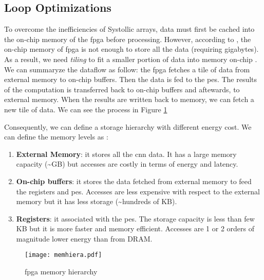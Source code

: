 \subsection{Loop Optimizations} \label{subsec:loopopti}
%
%
To overcome the inefficiencies of Systollic arrays, data must first be cached into the on-chip memory of the \acrshort{fpga} before processing. However, according to \textcite{ma_optimizing_2018}, the on-chip memory of \acrshort{fpga} is not enough to store all the data (requiring gigabytes). As a result, we need \textit{tiling} to fit a smaller portion of data into memory on-chip \cite{zhang_optimizing_2015}. We can summaryze the dataflow as follow: the \acrshort{fpga} fetches a tile of data from external memory to on-chip buffers. Then the data is fed to the \acrshort{pe}s. The results of the computation is transferred back to on-chip buffers and aftewards, to external memory. When the results are written back to memory, we can fetch a new tile of data. We can see the process in Figure \ref{fig:hierarchy}

Consequently, we can define a storage hierarchy with different energy cost. We can define the memory levels as \cite{horowitz_11_2014, sze_efficient_2017}:
%
\begin{enumerate}
    \item \textbf{External Memory}: it stores all the \acrshort{cnn} data. It has a large memory capacity (\textasciitilde GB) but accesses are costly in terms of energy and latency.
    \item \textbf{On-chip buffers}: it stores the data fetched from external memory to feed the registers and \acrshort{pe}s. Accesses are less expensive with respect to the external memory but it has less storage (\textasciitilde hundreds of KB).
    \item \textbf{Registers}: it associated with the \acrshort{pe}s. The storage capacity is less than few KB but it is more faster and memory efficient. Accesses are 1 or 2 orders of magnitude lower energy than from DRAM.
\end{enumerate}
%
\begin{figure}
    \centering
    \texttt{[image: memhiera.pdf]}
    \caption{\acrshort{fpga} memory hierarchy \cite{ma_optimizing_2018}}
    \label{fig:hierarchy}
\end{figure}

